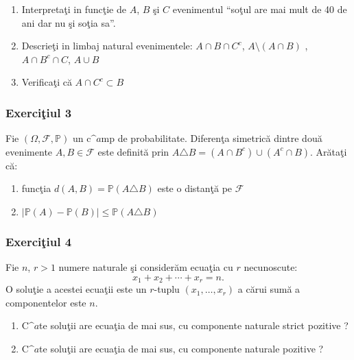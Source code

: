 \documentclass[]{article}
\def\Om{\Omega}
\def\PP{{\mathbb P}}
\def\MF{{\mathcal F}}
\begin{document}
\begin{enumerate}
\def\labelenumi{\alph{enumi})}
\item
  Interpreta\c ti in func\c tie de \(A\), \(B\) \c si \(C\) evenimentul
  ``so\c tul are mai mult de 40 de ani dar nu \c si so\c tia sa''.
\item
  Descrie\c ti in limbaj natural evenimentele: \(A\cap B\cap C^{c}\),
  \(A\setminus{(A\cap B)}\) , \(A\cap B^{c}\cap C\), \(A\cup B\)
\item
  Verifica\c ti c\u a \(A\cap C^{c} \subset B\)
\end{enumerate}

\subsubsection{\texorpdfstring{Exerci\c tiul
3}{Exerciiul 3}}\label{exerciiul-3}

Fie \((\Om, \MF, \PP)\) un c\(\^a\)mp de probabilitate. Diferen\c ta
simetric\u a dintre dou\u a evenimente \(A, B\in \MF\) este definit\u a
prin \(A \triangle B=(A\cap B^{c})\cup(A^{c}\cap B)\). Ar\u ata\c ti
c\u a:

\begin{enumerate}
\def\labelenumi{\alph{enumi})}
\item
  func\c tia \(d(A,B)=\PP(A\triangle B)\) este o distan\c t\u a pe
  \(\MF\)
\item
  \(|\PP(A)-\PP(B)|\leq\PP(A\triangle B)\)
\end{enumerate}

\subsubsection{\texorpdfstring{Exerci\c tiul
4}{Exerciiul 4}}\label{exerciiul-4}

Fie \(n\), \(r>1\) numere naturale \c si consider\u am ecua\c tia cu
\(r\) necunoscute: \[
x_1+x_2+\cdots+x_r=n.
\] O solu\c tie a acestei ecua\c tii este un \(r\)-tuplu
\((x_1, \dots, x_r)\) a c\u arui sum\u a a componentelor este \(n\).

\begin{enumerate}
\def\labelenumi{\alph{enumi})}
\item
  C\(\^a\)te solu\c tii are ecua\c tia de mai sus, cu componente
  naturale strict pozitive ?
\item
  C\(\^a\)te solu\c tii are ecua\c tia de mai sus, cu componente
  naturale pozitive ?
\end{enumerate}
\end{document}
